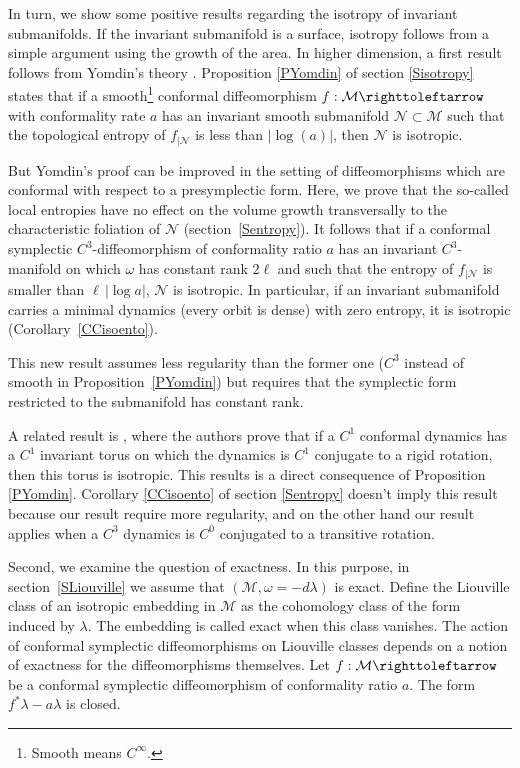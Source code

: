 \documentclass[JEP,XML,SOM,Unicode,published]{cedram}
\theoremstyle{definition}
\def\cM{{\mathcal M}}
\def\cN{{\mathcal N}}
\begin{document}
In turn, we show some positive results regarding the isotropy of invariant submanifolds. If the invariant submanifold is a surface, isotropy follows from a simple argument using the growth of the area. In higher dimension, a first result follows from Yomdin's theory \cite{Yom1987, Gromov1987}. Proposition \ref{PYomdin} of section \ref{Sisotropy} states that if a smooth\footnote{Smooth means $C^\infty$.} conformal diffeomorphism $f: \cM \righttoleftarrow$ with conformality rate $a$ has an invariant smooth submanifold $\cN \subset \cM$ such that the topological entropy of $f_{|\cN}$ is less than $|\log(a)|$, then $\cN$ is isotropic.

But Yomdin's proof can be improved in the setting of diffeomorphisms which are conformal with respect to a presymplectic form. Here, we prove that the so-called local entropies have no effect on the volume growth transversally to the characteristic foliation of $\cN$ (section~\ref{Sentropy}). It follows that if a conformal symplectic $C^3$-diffeomorphism
of conformality ratio $a$ has an invariant $C^3$-manifold on which $\omega$ has constant rank $2\ell$ and such that the entropy of $f_{|\cN}$ is smaller than $\ell\, |\log a|$, $\cN$ is isotropic. In particular, if an invariant submanifold carries a minimal dynamics (every orbit is dense) with zero entropy, it is isotropic (Corollary~\ref{CCisoento}).

This new result assumes less regularity than the former one ($C^3$ instead of smooth in Proposition~\ref{PYomdin}) but requires that the symplectic form restricted to the submanifold has constant rank.

A related result is \cite[2.2.1]{CaCeLlA2013}, where the authors prove that if a $C^1$ conformal dynamics has a $C^1$ invariant torus on which the dynamics is $C^1$ conjugate to a rigid rotation, then this torus is isotropic. This results is a direct consequence of Proposition \ref{PYomdin}. Corollary \ref{CCisoento} of section \ref{Sentropy} doesn't imply this result because our result require more regularity, and on the other hand our result applies when a $C^3$ dynamics is $C^0$ conjugated to a transitive rotation.

Second, we examine the question of exactness. In this purpose, in section~\ref{SLiouville} we assume that $(\cM, \omega=-d\lambda)$ is exact. Define the Liouville class of an isotropic embedding in $\cM$ as the cohomology class of the form induced by $\lambda$. The embedding is called \hbox{exact} when this class vanishes.
The action of conformal symplectic diffeomorphisms on \hbox{Liouville} classes depends on a notion of exactness for the diffeomorphisms themselves. Let $f: \cM \righttoleftarrow$ be a conformal symplectic diffeomorphism of conformality ratio $a$. The form $f^*\lambda-a\lambda$ is closed.
\end{document}
